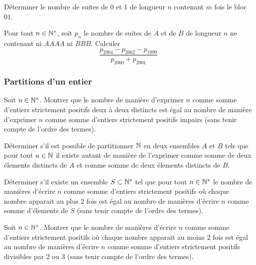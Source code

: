 \begin{exo}
Déterminer le nombre de suites de $0$ et $1$ de longueur $n$ contenant $m$ fois le bloc $01$.
\end{exo}

\begin{exo}
Pour tout $n\in\mathbb N^*$, soit $p_n$ le nombre de suites de $A$ et de $B$ de longueur $n$ ne contenant ni $AAAA$ ni $BBB$. Calculer
\[\frac{p_{2004}-p_{2002}-p_{1999}}{p_{2000}+p_{2001}}\]
\end{exo}

\subsubsection*{Partitions d'un entier}%

\begin{exo}
Soit $n\in\mathbb N^*$. Montrer que le nombre de manière d'exprimer $n$ comme somme d'entiers strictement positifs deux à deux distincts est égal au nombre de manière d'exprimer $n$ comme somme d'entiers strictement positifs impairs (sans tenir compte de l'ordre des termes).
\end{exo}

\begin{exo}
Déterminer s'il est possible de partitionner $\mathbb N$ en deux ensembles $A$ et $B$ tels que pour tout $n\in\mathbb N$ il existe autant de manière de l'exprimer comme somme de deux élements distincts de $A$ et comme somme de deux élements distincts de $B$.
\end{exo}

\begin{exo}
Déterminer s'il existe un ensemble $S\subset\mathbb N^*$ tel que pour tout $n\in\mathbb N^*$ le nombre de manières d'écrire $n$ comme somme d'entiers strictement positifs où chaque nombre apparait au plus $2$ fois est égal au nombre de manières d'écrire $n$ comme somme d'élements de $S$ (sans tenir compte de l'ordre des termes).
\end{exo}

\begin{exo}
Soit $n\in\mathbb N^*$. Montrer que le nombre de manières d'écrire $n$ comme somme d'entiers strictement positifs où chaque nombre apparait au moins $2$ fois est égal au nombre de manières d'écrire $n$ comme somme d'entiers strictement positifs divisibles par $2$ ou $3$ (sans tenir compte de l'ordre des termes).
\end{exo}

